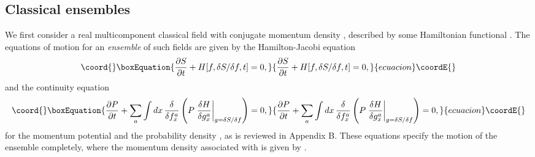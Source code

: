 \documentclass[a4paper,preprint, showpacs, aps, draft]{revtex4}
\begin{document}
{\subsection{Classical ensembles}

We first consider a real multicomponent classical field \coordHE{} 
with conjugate
momentum density \coordHE{}, described by some Hamiltonian functional
\coordHE{}.
The equations of motion for an {\it ensemble} of such fields are
given by the Hamilton-Jacobi equation
\begin{equation}\coord{}\boxEquation{ \label{mhj}
\frac{\partial S}{\partial t} + H[f,\delta S/\delta f, t] = 0 ,
}{ \frac{\partial S}{\partial t} + H[f,\delta S/\delta f, t] = 0 ,
}{ecuacion}\coordE{}\end{equation}
and the continuity equation
\begin{equation}\coord{}\boxEquation{ \label{mcont}
\frac{\partial P}{\partial t} + \sum_a\int dx\, \frac{\delta}{\delta
f^a_x}\left(P\left.\frac{\delta H}{\delta g^a_x}\right|_{g=\delta
S/\delta f}\right) = 0 ,
}{ \frac{\partial P}{\partial t} + \sum_a\int dx\, \frac{\delta}{\delta
f^a_x}\left(P\left.\frac{\delta H}{\delta g^a_x}\right|_{g=\delta
S/\delta f}\right) = 0 ,
}{ecuacion}\coordE{}\end{equation}
for the momentum potential \coordHE{} and the probability density \coordHE{},
as is reviewed in Appendix B.  These equations specify the motion of
the ensemble completely, where the momentum density associated with \coordHE{}
is given by \coordHE{}.

}
\end{document}
